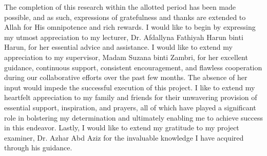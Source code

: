 \begin{acknowledgement}
The completion of this research within the allotted period has been made possible, and as such, expressions of gratefulness and thanks are extended to Allah for His omnipotence and rich rewards. I would like to begin by expressing my utmost appreciation to my lecturer, Dr. Afdallyna Fathiyah Harun binti Harun, for her essential advice and assistance. I would like to extend my appreciation to my supervisor, Madam Suzana binti Zambri, for her excellent guidance, continuous support, consistent encouragement, and flawless cooperation during our collaborative efforts over the past few months. The absence of her input would impede the successful execution of this project. I like to extend my heartfelt appreciation to my family and friends for their unwavering provision of essential support, inspiration, and prayers, all of which have played a significant role in bolstering my determination and ultimately enabling me to achieve success in this endeavor. Lastly, I would like to extend my gratitude to my project examiner, Dr. Azhar Abd Aziz for the invaluable knowledge I have acquired through his guidance.
\end{acknowledgement}